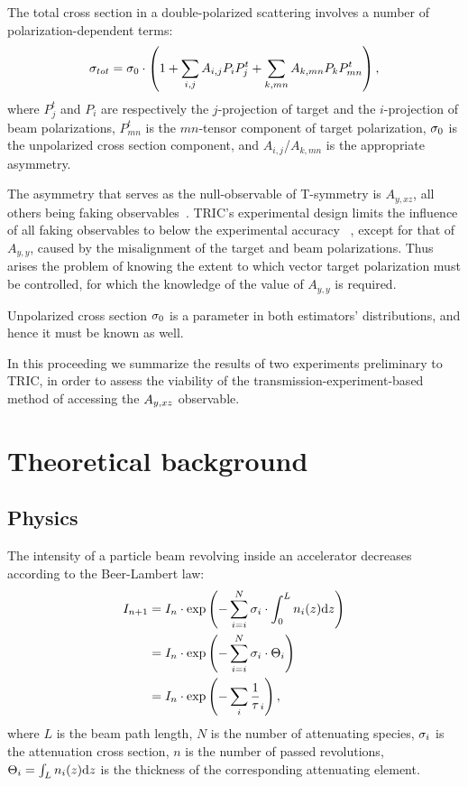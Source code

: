 \documentclass[reprint, superscriptaddress]{revtex4-1}
\newcommand{\td}{\mathrm{d}}
\begin{document}
The total cross section in a double-polarized scattering involves a number of polarization-dependent terms:
\begin{equation}\label{eq:PolCS}
	\CS[tot] = \CS[0]\cdot\bkt{1 + \sum_{i,j} A_{i,j} P_iP^t_j + \sum_{k, mn} A_{k,mn}P_k P^t_{mn}},
\end{equation}
where $P^t_j$ and $P_i$ are respectively the $j$-projection of target and the $i$-projection of beam polarizations, $P^t_{mn}$ is the $mn$-tensor component of target polarization, $\CS[0]$ is the unpolarized cross section component, and $A_{i,j}$/$A_{k,mn}$ is the appropriate asymmetry.

The asymmetry that serves as the null-observable of T-symmetry is $A_{y,xz}$, all others being faking observables~\cite{Conzett}. TRIC's experimental design limits the influence of all faking observables to below the experimental accuracy ~\cite{Proposal}, except for that of $A_{y,y}$, caused by the misalignment of the target and beam polarizations. Thus arises the problem of knowing the extent to which vector target polarization must be controlled, for which the knowledge of the value of $A_{y,y}$ is required. 

Unpolarized cross section $\CS[0]$ is a parameter in both estimators' distributions, and hence it must be known as well. 

In this proceeding we summarize the results of two experiments preliminary to TRIC, in order to assess the viability of the transmission-experiment-based method of accessing the $\Ayxz$ observable.

\section{Theoretical background}
\subsection{Physics}
The intensity of a particle beam revolving inside an accelerator decreases according to the Beer-Lambert law:
\begin{align*}
	I_{n+1} &= I_n \cdot \exp\bkt{-\sum_{i=i}^N \CS[i]\cdot\int_0^L n_i(z)\td z} \\
			&= I_n \cdot \exp\bkt{-\sum_{i=i}^N \CS[i]\cdot \Thick[i]} \\
			&= I_n \cdot \exp\bkt{-\sum_i\frac1\tau_i},
\end{align*}
where $L$ is the beam path length, $N$ is the number of attenuating species, $\CS[i]$ is the attenuation cross section, $n$ is the number of passed revolutions, $\Thick[i] = \int_L n_i(z)\td z$ is the thickness of the corresponding attenuating element.
\end{document}
